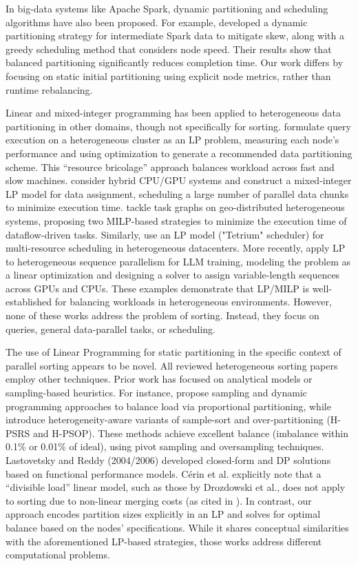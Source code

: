 \documentclass{article}
\begin{document}
In big-data systems like Apache Spark, dynamic partitioning and scheduling algorithms have also been proposed. For example, \cite{lu_time_aware_2023} developed a dynamic partitioning strategy for intermediate Spark data to mitigate skew, along with a greedy scheduling method that considers node speed. Their results show that balanced partitioning significantly reduces completion time. Our work differs by focusing on static initial partitioning using explicit node metrics, rather than runtime rebalancing.

Linear and mixed-integer programming has been applied to heterogeneous data partitioning in other domains, though not specifically for sorting. \cite{gptlp3} formulate query execution on a heterogeneous cluster as an LP problem, measuring each node's performance and using optimization to generate a recommended data partitioning scheme. This “resource bricolage” approach balances workload across fast and slow machines. \cite{gptlp4_5} consider hybrid CPU/GPU systems and construct a mixed-integer LP model for data assignment, scheduling a large number of parallel data chunks to minimize execution time. \cite{gptlp6} tackle task graphs on geo-distributed heterogeneous systems, proposing two MILP-based strategies to minimize the execution time of dataflow-driven tasks. Similarly, \cite{gptlp7} use an LP model ("Tetrium" scheduler) for multi-resource scheduling in heterogeneous datacenters. More recently, \cite{gptlp8} apply LP to heterogeneous sequence parallelism for LLM training, modeling the problem as a linear optimization and designing a solver to assign variable-length sequences across GPUs and CPUs. These examples demonstrate that LP/MILP is well-established for balancing workloads in heterogeneous environments. However, none of these works address the problem of sorting. Instead, they focus on queries, general data-parallel tasks, or scheduling.

The use of Linear Programming for static partitioning in the specific context of parallel sorting appears to be novel. All reviewed heterogeneous sorting papers employ other techniques. Prior work has focused on analytical models or sampling-based heuristics. For instance, \cite{gptlp1} propose sampling and dynamic programming approaches to balance load via proportional partitioning, while \cite{gptlp2} introduce heterogeneity-aware variants of sample-sort and over-partitioning (H-PSRS and H-PSOP). These methods achieve excellent balance (imbalance within 0.1\% or 0.01\% of ideal), using pivot sampling and oversampling techniques. Lastovetsky and Reddy (2004/2006) developed closed-form and DP solutions based on functional performance models. Cérin et al. explicitly note that a “divisible load” linear model, such as those by Drozdowski et al., does not apply to sorting due to non-linear merging costs (as cited in \cite{gptlp1}). In contrast, our approach encodes partition sizes explicitly in an LP and solves for optimal balance based on the nodes’ specifications. While it shares conceptual similarities with the aforementioned LP-based strategies, those works address different computational problems.
\end{document}
